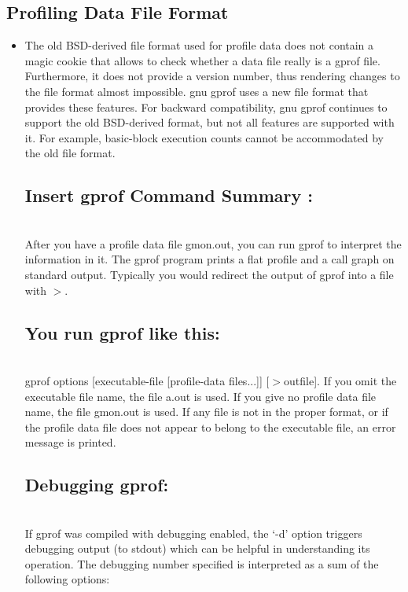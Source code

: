 \documentclass[a4paper,12pt]{article}
\begin{document}
	\subsection{Profiling Data File Format }
		\begin{itemize}
			\item The old BSD-derived file format used for profile data does not contain a magic cookie that allows to check whether a data file really is a gprof file. Furthermore, it does not provide a version number, thus rendering changes 	to the file format almost impossible. gnu gprof uses a new file format that provides these features. For backward compatibility, gnu gprof continues 	to support the old BSD-derived format, but not all features are supported with it. For example, basic-block execution counts cannot be accommodated by the old file format.\\ 
	\subsection{Insert gprof Command Summary :}\\
			After you have a profile data file gmon.out, you can run gprof to 			interpret the information in it. The gprof program prints a flat profile and 			a call graph on standard output. Typically you would redirect the output of 			gprof into a file with $>$. 
			
    \subsection{You run gprof like this:}\\
			gprof options [executable-file [profile-data files...]] [$> $outfile].
			If you omit the executable file name, the file a.out is used. If you give no    			profile data file name, the file gmon.out is used. If any file is not in the 			proper format, or if the profile data file does not appear to belong to the 			executable file, an error message is printed. 
			
	\subsection{Debugging gprof:}\\
			If gprof was compiled with debugging enabled, the `-d' option triggers debugging output (to stdout) which can be helpful in understanding its operation. The debugging number specified is interpreted as a sum of the following options: 
			

\end{itemize}
\end{document}
